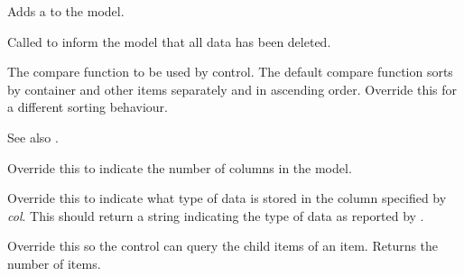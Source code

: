 \label{wxdataviewmodeladdnotifier}


Adds a 
to the model.

\label{wxdataviewmodelcleared}


Called to inform the model that all data has been deleted.

\label{wxdataviewmodelcompare}


The compare function to be used by control. The default compare function
sorts by container and other items separately and in ascending order.
Override this for a different sorting behaviour.

See also .

\label{wxdataviewmodelgetcolumncount}


Override this to indicate the number of columns in the model.

\label{wxdataviewmodelgetcolumntype}


Override this to indicate what type of data is stored in the
column specified by {\it col}. This should return a string
indicating the type of data as reported by .

\label{wxdataviewmodelgetchildren}


Override this so the control can query the child items of
an item. Returns the number of items.

\label{wxdataviewmodelgetparent}

